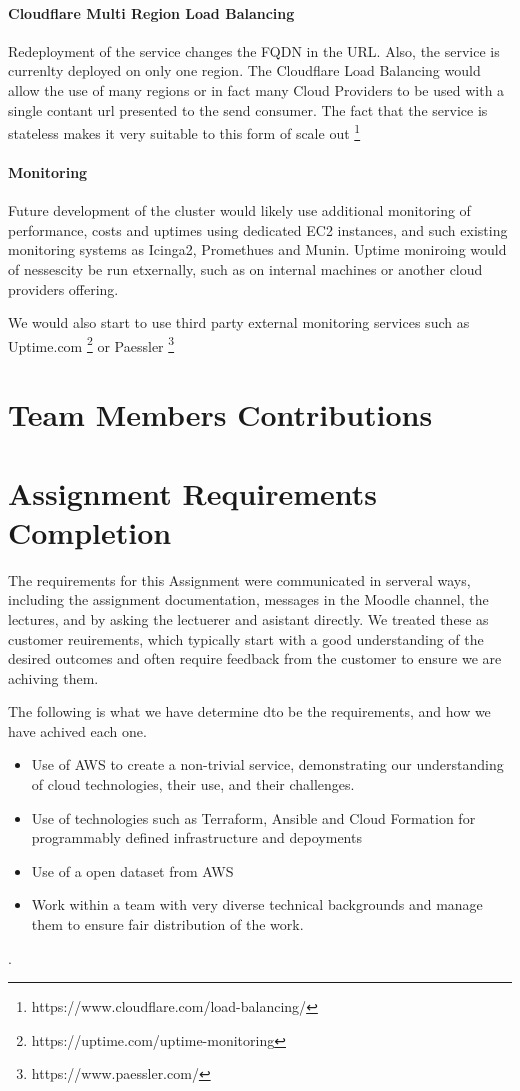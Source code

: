 \documentclass[conference]{IEEEtran}
\begin{document}
\paragraph{Cloudflare Multi Region Load Balancing}
Redeployment of the service changes the FQDN in the URL. Also, the service is currenlty deployed on only one region. The Cloudflare Load Balancing would allow the use of many regions or in fact many Cloud Providers to be used with a single contant url presented to the send consumer. The fact that the service is stateless makes it very suitable to this form of scale out \footnote{https://www.cloudflare.com/load-balancing/}
\paragraph{Monitoring}
Future development of the cluster would likely use additional monitoring of performance, costs and uptimes using dedicated EC2 instances, and such existing monitoring systems as Icinga2, Promethues and Munin. Uptime moniroing would of nessescity be run etxernally, such as on internal machines or another cloud providers offering. \par
We would also start to use third party external monitoring services such as Uptime.com \footnote{https://uptime.com/uptime-monitoring} or Paessler \footnote{https://www.paessler.com/}
\section{Team Members Contributions}
\section{Assignment Requirements Completion}
The requirements for this Assignment were communicated in serveral ways, including the assignment documentation, messages in the Moodle channel, the lectures, and by asking the lectuerer and asistant directly. We treated these as customer reuirements, which typically start with a good understanding of the desired outcomes and often require feedback from the customer to ensure we are achiving them.\par
The following is what we have determine dto be the requirements, and how we have achived each one.
\begin{itemize}
  \item Use of AWS to create a non-trivial service, demonstrating our understanding of cloud technologies, their use, and their challenges.
  \item Use of technologies such as Terraform, Ansible and Cloud Formation for programmably defined infrastructure and depoyments
  \item Use of a open dataset from AWS
  \item Work within a team with very diverse technical backgrounds and manage them to ensure fair distribution of the work.
\end{itemize}
.
\end{document}
